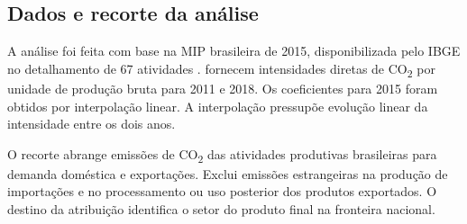 \subsection{Dados e recorte da análise}
\label{sec:dados}

A análise foi feita com base na MIP brasileira de 2015, disponibilizada pelo IBGE no detalhamento de 67 atividades \parencite{ibge2015mip}. \textcite{sanguinetAzzoni2024} fornecem intensidades diretas de CO\textsubscript{2} por unidade de produção bruta para 2011 e 2018. Os coeficientes para 2015 foram obtidos por interpolação linear. A interpolação pressupõe evolução linear da intensidade entre os dois anos.

O recorte abrange emissões de CO\textsubscript{2} das atividades produtivas brasileiras para demanda doméstica e exportações. Exclui emissões estrangeiras na produção de importações e no processamento ou uso posterior dos produtos exportados. O destino da atribuição identifica o setor do produto final na fronteira nacional. 
